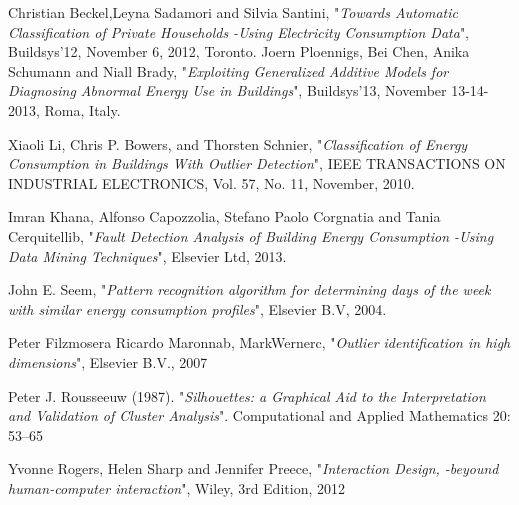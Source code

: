 \begin{thebibliography}{100}
Christian Beckel,Leyna Sadamori and Silvia Santini, "\emph{Towards Automatic Classification of Private Households -Using Electricity Consumption Data}", Buildsys’12, November 6, 2012, Toronto.
 Joern Ploennigs, Bei Chen, Anika Schumann and Niall Brady, "\emph{Exploiting Generalized Additive Models for Diagnosing Abnormal Energy Use in Buildings}", Buildsys’13, November 13-14-2013, Roma, Italy.

Xiaoli Li, Chris P. Bowers, and Thorsten Schnier, "\emph{Classification of Energy Consumption in Buildings With Outlier Detection}", IEEE TRANSACTIONS ON INDUSTRIAL ELECTRONICS, Vol. 57, No. 11, November, 2010.

Imran Khana, Alfonso Capozzolia, Stefano Paolo Corgnatia and Tania Cerquitellib, "\emph{Fault Detection Analysis of Building Energy Consumption -Using Data Mining Techniques}", Elsevier Ltd, 2013.

John E. Seem, "\emph{Pattern recognition algorithm for determining days of the week with similar energy consumption profiles}", Elsevier B.V, 2004.


Peter Filzmosera Ricardo Maronnab, MarkWernerc, "\emph{Outlier identification in high dimensions}", Elsevier B.V., 2007

Peter J. Rousseeuw (1987). "\emph{Silhouettes: a Graphical Aid to the Interpretation and Validation of Cluster Analysis}". Computational and Applied Mathematics 20: 53–65

Yvonne Rogers, Helen Sharp and Jennifer Preece, "\emph{Interaction Design, -beyound human-computer interaction}", Wiley, 3rd Edition, 2012

\end{thebibliography}
